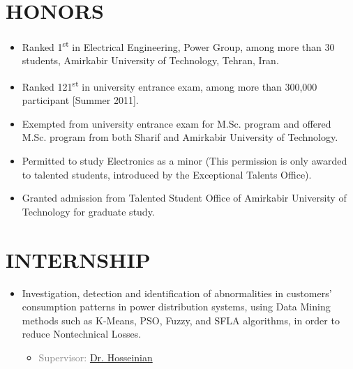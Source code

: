 \section{HONORS}

\begin{itemize}
\item Ranked 1\textsuperscript{st} in Electrical Engineering, Power Group, among more than 30 students,
Amirkabir University of Technology, Tehran, Iran.

\item Ranked 121\textsuperscript{st} in university entrance exam, among more than 300,000
participant [Summer 2011].

\item Exempted from university entrance exam for M.Sc. program and offered M.Sc. program from both
Sharif and Amirkabir University of Technology.

\item Permitted to study Electronics as a minor (This permission is only awarded to talented students, introduced by the Exceptional Talents Office).

\item Granted admission from Talented Student Office of Amirkabir University of Technology for graduate study. \\
\end{itemize}

\vspace{-1 em}
\section{INTERNSHIP}
\begin{itemize}
\item Investigation, detection and identification of abnormalities in customers' consumption patterns in power distribution systems, using Data Mining methods such as K-Means, PSO, Fuzzy, and SFLA algorithms, in order to reduce Nontechnical Losses.
\begin{itemize} 
\item\textcolor{gray}{Supervisor: \href{http://www.aut.ac.ir/official/main.asp?uid=hosseinian}{Dr. Hosseinian}} 
\end{itemize}
\end{itemize}

